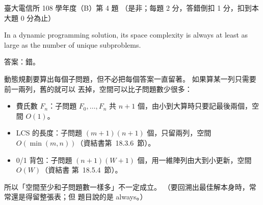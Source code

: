 \begin{pastexam}[label={px:ntu-108-comm-dsab-04}]{臺大電信所 108 學年度（B）第 4 題}
（是非；每題 2 分，答錯倒扣 1 分，扣到本大題 0 分為止）

In a dynamic programming solution, its space complexity is always at least as large as the
number of unique subproblems.
\end{pastexam}

\begin{pastsoln}
答案：錯。

動態規劃要算出每個子問題，但不必把每個答案一直留著。 如果算某一列只需要前一兩列，舊的就可以
丟掉，空間可以比子問題數少很多：
\begin{itemize}
\item 費氏數 $F_n$：子問題 $F_0, \ldots, F_n$ 共 $n + 1$ 個，由小到大算時只要記最後兩個，空間
$O(1)$。
\item LCS 的長度：子問題 $(m + 1)(n + 1)$ 個，只留兩列，空間 $O(\min(m, n))$（資結書第~18.3.6~節）。
\item 0/1 背包：子問題 $(n + 1)(W + 1)$ 個，用一維陣列由大到小更新，空間 $O(W)$（資結書
第~18.5.4~節）。
\end{itemize}
所以「空間至少和子問題數一樣多」不一定成立。 （要回溯出最佳解本身時，常常還是得留整張表；但
題目說的是 always。）
\end{pastsoln}
